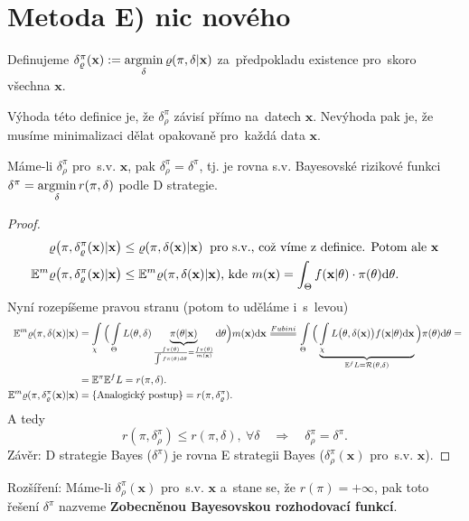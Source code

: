 \section{Metoda E) nic nového} 
Definujeme $\delta_\varrho^\pi(\textbf{x}):=\mathop{\mathrm{argmin}}\limits_{\delta}\varrho(\pi,\delta|\textbf{x})$ za~předpokladu existence pro~skoro všechna $\textbf{x}$.

\begin{remark}
	Výhoda této definice je, že $\delta_\rho^\pi$ závisí přímo na~datech $\textbf{x}$. Nevýhoda pak je, že musíme minimalizaci dělat opakovaně pro~každá data $\textbf{x}$.
\end{remark}
\begin{theorem}\label{veta_zamena}
	Máme-li $\delta_\rho^\pi$ pro~s.v. $\textbf{x}$, pak $\delta_\rho^\pi=\delta^\pi$, tj. je rovna s.v. Bayesovské rizikové funkci $\delta^\pi=\mathop{\mathrm{argmin}}\limits_\delta r(\pi,\delta)$ podle D strategie.
	\begin{proof}
		\[
		\begin{split}
		\varrho\big(\pi,\delta_\varrho^\pi(\textbf{x})|\textbf{x}\big)&\leq \varrho(\pi,\delta(\textbf{x})|\textbf{x}) \hspace{0.2cm} \text{pro s.v., což víme z~definice. Potom ale } \textbf{x} \\
		\mathbb{E}^m\varrho\big(\pi,\delta_\varrho^\pi(\textbf{x})|\textbf{x}\big)&\leq \mathbb{E}^m\varrho(\pi,\delta(\textbf{x})|\textbf{x})\text{, kde } m(\textbf{x})=\int_{\Theta}f(\textbf{x}|\theta)\cdot \pi(\theta)\mathrm{d}\theta.
		\end{split}
		\]
		Nyní rozepíšeme pravou stranu (potom to uděláme i~s~levou)
		\[
		\begin{split}
		\E^m\rho(\pi,\delta(\textbf{x})|\textbf{x})&=\int\limits_{\chi}\Big( \int\limits_{\Theta} L(\t,\delta)\underbrace{\pi(\t|\textbf{x})}_{\frac{f\pi(\t)}{\int f\pi(\t)\d\t}=\frac{f\pi(\t)}{m(\textbf{x})}}\d\t\Big)m(\textbf{x})\d\textbf{x}\equal{Fubini}\int\limits_{\Theta}\Big( \underbrace{\int\limits_{\chi} L\big(\t,\delta(\textbf{x})\big)f(\textbf{x}|\t)\d\textbf{x}}_{\E^f L=\RF(\t,\delta)} \Big)\pi(\t)\d\t=\\&=\E^\pi\E^f L=r(\pi,\delta). \\
		\E^m\rho(\pi,\delta_\rho^\pi(\textbf{x})|\textbf{x})&=\{\text{Analogický postup}\}=r(\pi,\delta_\rho^\pi).
		\end{split}
		\]
		A tedy 
		$$ r(\pi,\delta_\rho^\pi)\leq r(\pi,\delta),~\forall\delta\quad \Rightarrow\quad \delta_\rho^\pi=\delta^\pi.$$
		Závěr: D strategie Bayes ($\delta^\pi$) je rovna E strategii Bayes ($\delta_\rho^\pi(\textbf{x})$ pro~s.v. $\textbf{x}$).
	\end{proof} 
\end{theorem}
Rozšíření: Máme-li $\delta_\rho^\pi(\textbf{x})$ pro~s.v. $\textbf{x}$ a~stane se, že $r(\pi)=+\infty$, pak toto řešení $\delta^{\pi}$ nazveme \textbf{Zobecněnou Bayesovskou rozhodovací funkcí}.

